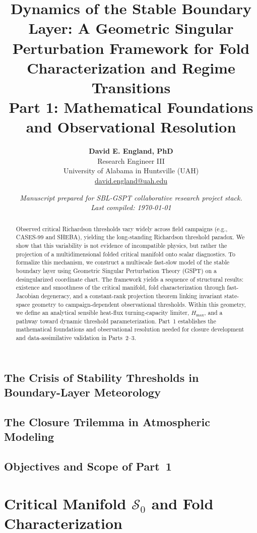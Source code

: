 \documentclass[11pt,letterpaper]{article}
\title{\textbf{Dynamics of the Stable Boundary Layer: A Geometric Singular Perturbation Framework for Fold Characterization and Regime Transitions}\\
\large Part 1: Mathematical Foundations and Observational Resolution}
\author{
    \textbf{David E. England, PhD} \\
    \small Research Engineer III \\
    \small University of Alabama in Huntsville (UAH) \\
    \small \href{mailto:david.england@uah.edu}{david.england@uah.edu}
}
\date{\small\itshape Manuscript prepared for SBL-GSPT collaborative research project stack. \\ Last compiled: \today}
\begin{document}
\maketitle

\begin{abstract}
Observed critical Richardson thresholds vary widely across field campaigns (e.g., CASES-99 and SHEBA), yielding the long-standing Richardson threshold paradox. We show that this variability is not evidence of incompatible physics, but rather the projection of a multidimensional folded critical manifold onto scalar diagnostics. To formalize this mechanism, we construct a multiscale fast-slow model of the stable boundary layer using Geometric Singular Perturbation Theory (GSPT) on a desingularized coordinate chart. The framework yields a sequence of structural results: existence and smoothness of the critical manifold, fold characterization through fast-Jacobian degeneracy, and a constant-rank projection theorem linking invariant state-space geometry to campaign-dependent observational thresholds. Within this geometry, we define an analytical sensible heat-flux turning-capacity limiter, $H_{\max}$, and a pathway toward dynamic threshold parameterization. Part~1 establishes the mathematical foundations and observational resolution needed for closure development and data-assimilative validation in Parts~2--3.
\end{abstract}



\subsection{The Crisis of Stability Thresholds in Boundary-Layer Meteorology}

\subsection{The Closure Trilemma in Atmospheric Modeling}

\subsection{Objectives and Scope of Part~1}



\section{Critical Manifold $\mathcal{S}_0$ and Fold Characterization}
\label{sec:critical-manifold}
\end{document}
